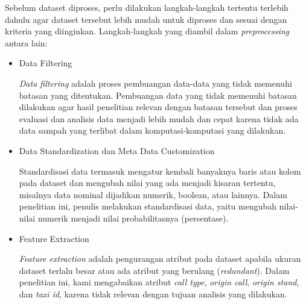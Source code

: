 \documentclass{article}
\begin{document}
\begin{adjustwidth}{4em}{0pt}

\hspace{\parindent}Sebelum dataset diproses, perlu dilakukan langkah-langkah tertentu terlebih dahulu agar dataset tersebut lebih mudah untuk diproses dan sesuai dengan kriteria yang diinginkan. Langkah-langkah yang diambil dalam \textit{preprocessing} antara lain:

\begin{itemize}
	\item{Data Filtering}
		
		\textit{Data filtering} adalah proses pembuangan data-data yang tidak memenuhi batasan yang ditentukan. Pembuangan data yang tidak memenuhi batasan dilakukan agar hasil penelitian relevan dengan batasan tersebut dan proses evaluasi dan analisis data menjadi lebih mudah dan cepat karena tidak ada data sampah yang terlibat dalam komputasi-komputasi yang dilakukan.
		
	\item{Data Standardization dan Meta Data Customization}
		
		Standardisasi data termasuk mengatur kembali banyaknya baris atau kolom pada dataset dan mengubah nilai yang ada menjadi kisaran tertentu, misalnya data nominal dijadikan numerik, boolean, atau lainnya. Dalam penelitian ini, penulis melakukan standardisasi data, yaitu mengubah nilai-nilai numerik menjadi nilai probabilitasnya (persentase).
		
	\item{Feature Extraction}
		
		\textit{Feature extraction} adalah pengurangan atribut pada dataset apabila ukuran dataset terlalu besar atau ada atribut yang berulang (\textit{redundant}). Dalam penelitian ini, kami mengabaikan atribut \textit{call type}, \textit{origin call}, \textit{origin stand}, dan \textit{taxi id}, karena tidak relevan dengan tujuan analisis yang dilakukan.
		
\end{itemize}

\end{adjustwidth}
\end{document}
